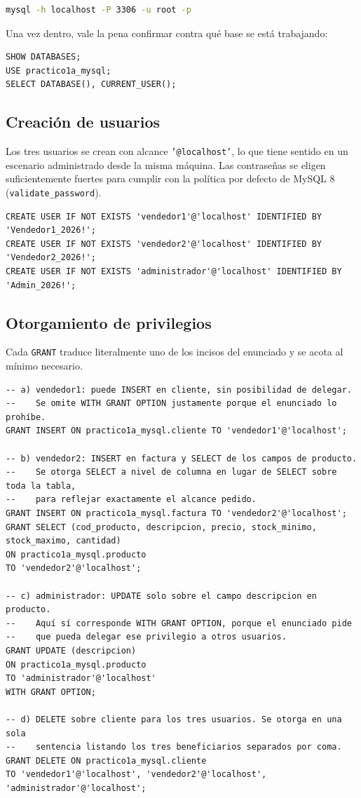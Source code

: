 \documentclass[11pt,a4paper]{article}
\begin{document}
\begin{lstlisting}[language=bash]
mysql -h localhost -P 3306 -u root -p
\end{lstlisting}

Una vez dentro, vale la pena confirmar contra qué base se está trabajando:

\begin{lstlisting}
SHOW DATABASES;
USE practico1a_mysql;
SELECT DATABASE(), CURRENT_USER();
\end{lstlisting}

\subsection{Creación de usuarios}

Los tres usuarios se crean con alcance \texttt{'@localhost'}, lo que tiene sentido en un escenario administrado desde la misma máquina. Las contraseñas se eligen suficientemente fuertes para cumplir con la política por defecto de MySQL 8 (\texttt{validate\_password}).

\begin{lstlisting}
CREATE USER IF NOT EXISTS 'vendedor1'@'localhost' IDENTIFIED BY 'Vendedor1_2026!';
CREATE USER IF NOT EXISTS 'vendedor2'@'localhost' IDENTIFIED BY 'Vendedor2_2026!';
CREATE USER IF NOT EXISTS 'administrador'@'localhost' IDENTIFIED BY 'Admin_2026!';
\end{lstlisting}

\subsection{Otorgamiento de privilegios}

Cada \texttt{GRANT} traduce literalmente uno de los incisos del enunciado y se acota al mínimo necesario.

\begin{lstlisting}
-- a) vendedor1: puede INSERT en cliente, sin posibilidad de delegar.
--    Se omite WITH GRANT OPTION justamente porque el enunciado lo prohíbe.
GRANT INSERT ON practico1a_mysql.cliente TO 'vendedor1'@'localhost';

-- b) vendedor2: INSERT en factura y SELECT de los campos de producto.
--    Se otorga SELECT a nivel de columna en lugar de SELECT sobre toda la tabla,
--    para reflejar exactamente el alcance pedido.
GRANT INSERT ON practico1a_mysql.factura TO 'vendedor2'@'localhost';
GRANT SELECT (cod_producto, descripcion, precio, stock_minimo, stock_maximo, cantidad)
ON practico1a_mysql.producto
TO 'vendedor2'@'localhost';

-- c) administrador: UPDATE solo sobre el campo descripcion en producto.
--    Aquí sí corresponde WITH GRANT OPTION, porque el enunciado pide
--    que pueda delegar ese privilegio a otros usuarios.
GRANT UPDATE (descripcion)
ON practico1a_mysql.producto
TO 'administrador'@'localhost'
WITH GRANT OPTION;

-- d) DELETE sobre cliente para los tres usuarios. Se otorga en una sola
--    sentencia listando los tres beneficiarios separados por coma.
GRANT DELETE ON practico1a_mysql.cliente
TO 'vendedor1'@'localhost', 'vendedor2'@'localhost', 'administrador'@'localhost';
\end{lstlisting}
\end{document}
